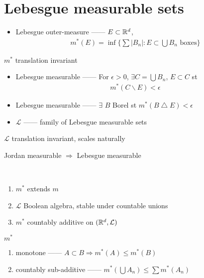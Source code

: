 \section{Lebesgue measurable sets}\label{sec:lebesgue-measurable-sets}

\begin{itemize}
    \item Lebesgue outer-measure ------ $E \subset \mathbb{R}^d$,
    \begin{align*}
        m^{\ast}(E) = \inf \{ \sum |B_n| : E \subset \bigcup B_n \text{ boxes}\}
    \end{align*}
\end{itemize}

\begin{fact}
    $m^\ast$ translation invariant
\end{fact}

\begin{itemize}
    \item Lebesgue measurable ------ For $\epsilon > 0$, $\exists C = \bigcup B_n$, $E \subset C$ st
    \begin{align*}
        m^\ast (C \backslash E) < \epsilon
    \end{align*}
    \item Lebesgue measurable ------ $\exists$ $B$ Borel st $m^*(B \bigtriangleup E) < \epsilon$
    \item $\mathcal{L}$ ------ family of Lebesgue measurable sets
\end{itemize}

\begin{fact}
    $\mathcal{L}$ translation invariant, scales naturally
\end{fact}

\begin{fact}
    Jordan measurable $\Rightarrow$ Lebesgue measurable
\end{fact}

\begin{prop}
    \,
    \begin{enumerate}
        \item $m^\ast$ extends $m$
        \item $\mathcal{L}$ Boolean algebra, stable under countable unions
        \item $m^\ast$ countably additive on $(\mathbb{R}^d, \mathcal{L})$
    \end{enumerate}
\end{prop}

\begin{lemma}
    $m^\ast$
    \begin{enumerate}
        \item monotone ------ $A \subset B \Rightarrow m^\ast(A) \leq m^\ast(B)$
        \item countably sub-additive ------ $m^\ast\left(\bigcup A_n\right) \leq \sum m^\ast(A_n)$
    \end{enumerate}
\end{lemma}

